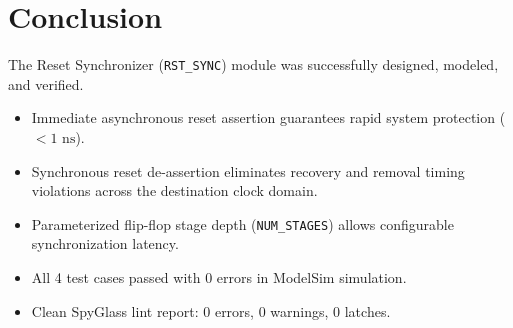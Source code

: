 \documentclass[12pt,a4paper]{article}
\begin{document}
\section{Conclusion}

The Reset Synchronizer (\texttt{RST\_SYNC}) module was successfully designed, modeled, and verified.
\begin{itemize}
    \item Immediate asynchronous reset assertion guarantees rapid system protection ($< 1\text{ ns}$).
    \item Synchronous reset de-assertion eliminates recovery and removal timing violations across the destination clock domain.
    \item Parameterized flip-flop stage depth (\texttt{NUM\_STAGES}) allows configurable synchronization latency.
    \item All 4 test cases passed with 0 errors in ModelSim simulation.
    \item Clean SpyGlass lint report: 0 errors, 0 warnings, 0 latches.
\end{itemize}
\end{document}
